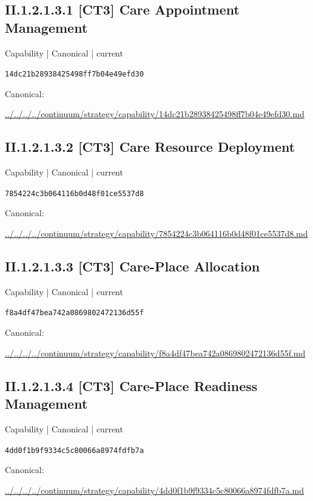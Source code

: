 \documentclass[10pt,a4paper]{article}
\begin{document}
\subsection*{II.1.2.1.3.1 [CT3] Care Appointment Management}
\label{element-14dc21b28938425498ff7b04e49efd30}
{\small Capability | Canonical | current}\par
\texttt{14dc21b28938425498ff7b04e49efd30}\par
Canonical: \par
{\footnotesize\url{../../../../continuum/strategy/capability/14dc21b28938425498ff7b04e49efd30.md}}\par
\subsection*{II.1.2.1.3.2 [CT3] Care Resource Deployment}
\label{element-7854224c3b064116b0d48f01ce5537d8}
{\small Capability | Canonical | current}\par
\texttt{7854224c3b064116b0d48f01ce5537d8}\par
Canonical: \par
{\footnotesize\url{../../../../continuum/strategy/capability/7854224c3b064116b0d48f01ce5537d8.md}}\par
\subsection*{II.1.2.1.3.3 [CT3] Care-Place Allocation}
\label{element-f8a4df47bea742a0869802472136d55f}
{\small Capability | Canonical | current}\par
\texttt{f8a4df47bea742a0869802472136d55f}\par
Canonical: \par
{\footnotesize\url{../../../../continuum/strategy/capability/f8a4df47bea742a0869802472136d55f.md}}\par
\subsection*{II.1.2.1.3.4 [CT3] Care-Place Readiness Management}
\label{element-4dd0f1b9f9334c5c80066a8974fdfb7a}
{\small Capability | Canonical | current}\par
\texttt{4dd0f1b9f9334c5c80066a8974fdfb7a}\par
Canonical: \par
{\footnotesize\url{../../../../continuum/strategy/capability/4dd0f1b9f9334c5c80066a8974fdfb7a.md}}\par
\end{document}
